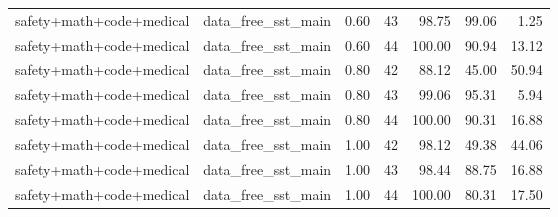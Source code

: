 \documentclass{article}
\begin{document}
\begin{table}[H]
{\begin{tabular}{llllrrr}
safety+math+code+medical & data\_free\_sst\_main & 0.60 & 43 & 98.75 & 99.06 & 1.25 \\
safety+math+code+medical & data\_free\_sst\_main & 0.60 & 44 & 100.00 & 90.94 & 13.12 \\
safety+math+code+medical & data\_free\_sst\_main & 0.80 & 42 & 88.12 & 45.00 & 50.94 \\
safety+math+code+medical & data\_free\_sst\_main & 0.80 & 43 & 99.06 & 95.31 & 5.94 \\
safety+math+code+medical & data\_free\_sst\_main & 0.80 & 44 & 100.00 & 90.31 & 16.88 \\
safety+math+code+medical & data\_free\_sst\_main & 1.00 & 42 & 98.12 & 49.38 & 44.06 \\
safety+math+code+medical & data\_free\_sst\_main & 1.00 & 43 & 98.44 & 88.75 & 16.88 \\
safety+math+code+medical & data\_free\_sst\_main & 1.00 & 44 & 100.00 & 80.31 & 17.50 \\
\bottomrule
\end{tabular}
}
\end{table}
\end{document}
